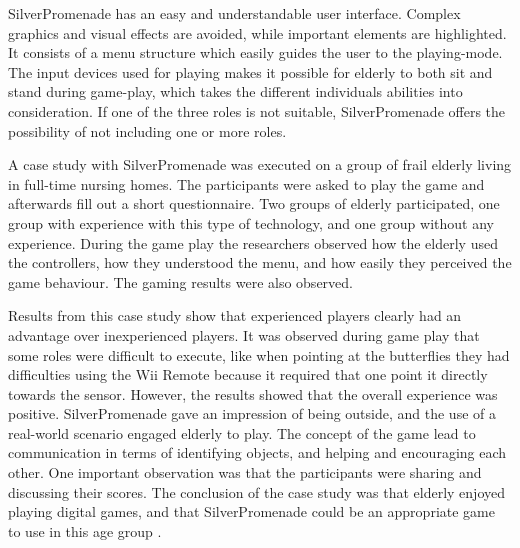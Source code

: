 SilverPromenade has an easy and understandable user interface. Complex graphics and visual effects are avoided, while important elements are highlighted. It consists of a menu structure which easily guides the user to the playing-mode. The input devices used for playing makes it possible for elderly to both sit and stand during game-play, which takes the different individuals abilities into consideration.  If one of the three roles is not suitable, SilverPromenade offers the possibility of not including one or more roles.

A case study with SilverPromenade was executed on a group of frail elderly living in full-time nursing homes. The participants were asked to play the game and afterwards fill out a short questionnaire. Two groups of elderly participated, one group with experience with this type of technology, and one group without any experience. During the game play the researchers observed how the elderly used the controllers, how they understood the menu, and how easily they perceived the game behaviour. The gaming results were also observed.

Results from this case study show that experienced players clearly had an advantage over inexperienced players. It was observed during game play that some roles were difficult to execute, like when pointing at the butterflies they had difficulties using the Wii Remote because it required that one point it directly towards the sensor. However, the results showed that the overall experience was positive. SilverPromenade gave an impression of being outside, and the use of a real-world scenario engaged elderly to play. The concept of the game lead to communication in terms of identifying objects, and helping and encouraging each other. One important observation was that the participants were sharing and discussing their scores. The conclusion of the case study was that elderly enjoyed playing digital games, and that SilverPromenade could be an appropriate game to use in this age group \cite{gerling2}.

